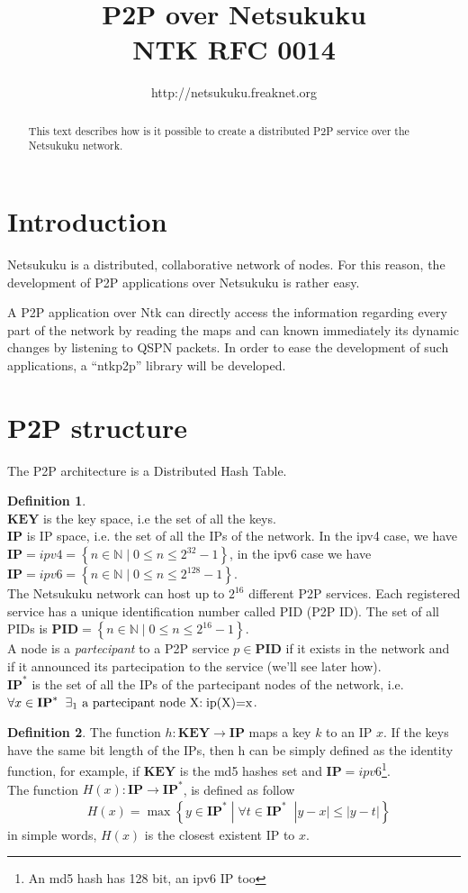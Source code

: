 \documentclass[a4paper]{article}
\title{P2P over Netsukuku\\\small{NTK RFC 0014}}
\author{http://netsukuku.freaknet.org}
\newcommand{\T}[1]{\textrm{#1}}
\newcommand{\pgra}[1]{\left\{#1\right\}}
\newcommand{\eal}[1]{{\begin{align*} #1 \end{align*}}}
\newcommand{\qq}{\qquad}
\theoremstyle{definition}
\newtheorem{defn}{Definition}[section]
\begin{document}
\maketitle
\begin{abstract}
This text describes how is it possible to create a distributed P2P service
over the Netsukuku network.
\end{abstract}

\section{Introduction}

Netsukuku is a distributed, collaborative network of nodes. 
For this reason, the development of P2P applications over Netsukuku is
rather easy.

A P2P application over Ntk can directly access the information
regarding every part of the network by reading the maps and can known
immediately its dynamic changes by listening to QSPN packets.
In order to ease the development of such applications, a ``ntkp2p'' library will
be developed.

\section{P2P structure}
\def\key{\textbf{KEY}}
\def\ip{\textbf{IP}}
\def\ipe{\textbf{IP}^*}
\def\PID{\textbf{PID}}
The P2P architecture is a Distributed Hash Table.
\begin{defn}\qq\\
$\key$ is the key space, i.e the set of all the keys. \\
$\ip$ is IP space, i.e. the set of all the IPs of the network. In the ipv4 case, we have 
$\ip=ipv4=\pgra{n\in\mathbb{N}\;|\;0\le n\le 2^{32}-1}$, in the ipv6 case we have
$\ip=ipv6=\pgra{n\in\mathbb{N}\;|\;0\le n\le 2^{128}-1}$.\\
The Netsukuku network can host up to $2^{16}$ different P2P services. Each
registered service has a unique identification number called PID (P2P ID). The
set of all PIDs is $\PID=\pgra{n\in \mathbb{N}\;|\;0\le n\le 2^{16}-1}$.\\
A node is a \emph{partecipant} to a P2P service $p\in \PID$ if it exists in the
network and if it announced its partecipation to the service (we'll see later
how).\\
$\ipe$ is the set of all the IPs of the partecipant nodes of the network, i.e. 
$\forall x\in \ipe\;\;\exists_1 \T{ a partecipant node X:\;ip(X)=x}$.
\end{defn}
\begin{defn}
The function $h:\key\longrightarrow \ip$ maps a key $k$ to an IP $x$.
If the keys have the same bit length of the IPs, then h can be
simply defined as the identity function, for example, if $\key$ is the md5
hashes set and $\ip=ipv6$\footnote{An md5 hash has 128 bit, an ipv6 IP too}.\\
The function $H(x):\ip\longrightarrow \ipe$, is defined as follow
\eal{&H(x)=\max \pgra{y\in \ipe \;|\; \forall t\in \ipe\;\;|y-x| \le  |y-t| } }
in simple words, $H(x)$ is the closest existent IP to $x$.
\end{defn}
\end{document}
